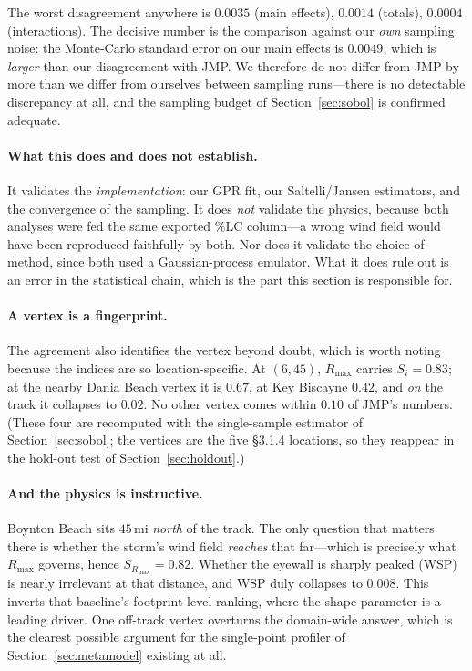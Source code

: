 \documentclass[11pt]{article}
\begin{document}
The worst disagreement anywhere is $0.0035$ (main effects), $0.0014$ (totals),
$0.0004$ (interactions). The decisive number is the comparison against our \emph{own}
sampling noise: the Monte-Carlo standard error on our main effects is $0.0049$, which is
\emph{larger} than our disagreement with JMP. We therefore do not differ from JMP by more
than we differ from ourselves between sampling runs---there is no detectable discrepancy
at all, and the sampling budget of Section~\ref{sec:sobol} is confirmed adequate.

\paragraph{What this does and does not establish.} It validates the \emph{implementation}:
our GPR fit, our Saltelli/Jansen estimators, and the convergence of the sampling. It
does \emph{not} validate the physics, because both analyses were fed the same exported
$\%\mathrm{LC}$ column---a wrong wind field would have been reproduced faithfully by
both. Nor does it validate the choice of method, since both used a Gaussian-process
emulator. What it does rule out is an error in the statistical chain, which is the part
this section is responsible for.

\paragraph{A vertex is a fingerprint.} The agreement also identifies the vertex beyond
doubt, which is worth noting because the indices are so location-specific. At $(6,45)$,
$R_{\max}$ carries $S_i=0.83$; at the nearby Dania Beach vertex it is $0.67$, at Key
Biscayne $0.42$, and \emph{on} the track it collapses to $0.02$. No other vertex comes
within $0.10$ of JMP's numbers. (These four are recomputed with the single-sample
estimator of Section~\ref{sec:sobol}; the vertices are the five §3.1.4 locations, so
they reappear in the hold-out test of Section~\ref{sec:holdout}.)

\paragraph{And the physics is instructive.} Boynton Beach sits $45$\,mi \emph{north} of
the track. The only question that matters there is whether the storm's wind field
\emph{reaches} that far---which is precisely what $R_{\max}$ governs, hence
$S_{R_{\max}}=0.82$. Whether the eyewall is sharply peaked (WSP) is nearly irrelevant
at that distance, and WSP duly collapses to $0.008$. This inverts that baseline's
footprint-level ranking, where the shape parameter is a leading driver. One off-track
vertex overturns the domain-wide answer, which is the clearest possible argument for
the single-point profiler of Section~\ref{sec:metamodel} existing at all.
\end{document}
